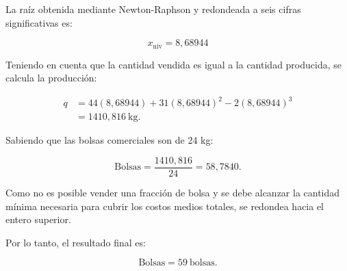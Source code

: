 La raíz obtenida mediante Newton-Raphson y redondeada a seis cifras significativas es:

\begin{equation}
    \boxed{x_{\text{niv}} = 8{,}68944}
\end{equation}

Teniendo en cuenta que la cantidad vendida es igual a la cantidad producida, se calcula la producción:

\begin{equation}
\begin{aligned}
q &= 44(8{,}68944) + 31(8{,}68944)^2 - 2(8{,}68944)^3 \\
&= 1410{,}816\ \text{kg}.
\end{aligned}
\end{equation}

Sabiendo que las bolsas comerciales son de 24 kg:

\begin{equation}
    \text{Bolsas} = \frac{1410{,}816}{24} = 58{,}7840.
\end{equation}

Como no es posible vender una fracción de bolsa y se debe alcanzar la cantidad mínima necesaria para cubrir los costos medios totales, se redondea hacia el entero superior.

Por lo tanto, el resultado final es:

\begin{equation}
    \boxed{\text{Bolsas} = 59\ \text{bolsas}.}
\end{equation}
